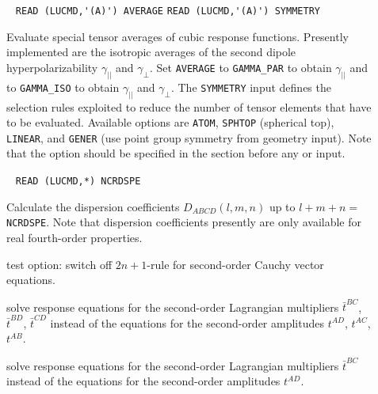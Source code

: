 \begin{description}
%
\item[] \verb| |\newline
\verb|READ (LUCMD,'(A)') AVERAGE|\newline
\verb|READ (LUCMD,'(A)') SYMMETRY|

Evaluate special tensor averages of cubic response functions.
Presently implemented are the isotropic averages of the second
dipole hyperpolarizability
$\gamma_{||}$ and $\gamma_{\bot}$.
Set \verb+AVERAGE+ to \verb+GAMMA_PAR+ 
to obtain $\gamma_{||}$ and to
\verb+GAMMA_ISO+ to obtain $\gamma_{||}$ and $\gamma_{\bot}$.
The \verb+SYMMETRY+ input defines the selection rules 
exploited to reduce the number of tensor elements that have to be
evaluated. Available options are
\verb+ATOM+, \verb+SPHTOP+ (spherical top), \verb+LINEAR+,
and \verb+GENER+ (use point group symmetry from geometry input).
Note that the  option should be specified in the 
section before any  or  input.
 
\item[] \verb| |\newline
\verb|READ (LUCMD,*) NCRDSPE| 

Calculate the dispersion coefficients $D_{ABCD}(l,m,n)$ up  to
$l+m+n = $ \verb+NCRDSPE+.
Note that dispersion coefficients presently are only available for
real fourth-order properties.
 
 
\item[] test option: switch off $2n+1$-rule for second-order
                    Cauchy vector equations.
 
\item[] solve response equations for the second-order
Lagrangian multipliers $\bar{t}^{BC}$, $\bar{t}^{BD}$, $\bar{t}^{CD}$
instead of the equations for the second-order amplitudes
$t^{AD}$, $t^{AC}$, $t^{AB}$.
 
\item[] solve response equations for the second-order
Lagrangian multipliers $\bar{t}^{BC}$ instead of the equations for 
the second-order amplitudes $t^{AD}$.
 
\end{description}
